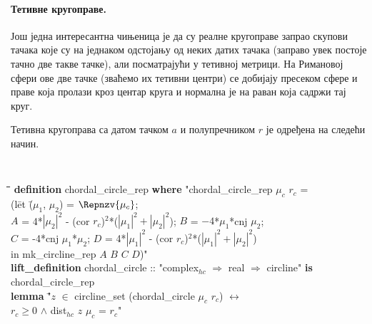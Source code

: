 \paragraph{Тетивне кругоправе.}
Још једна интересантна чињеница је да су реалне кругоправе запрао
скупови тачака које су на једнаком одстојању од неких датих тачака
(заправо увек постоје тачно две такве тачке), али посматрајући у
тетивној метрици. На Римановој сфери ове две тачке (зваћемо их тетивни
центри) се добијају пресеком сфере и праве која пролази кроз центар
круга и нормална је на раван која садржи тај круг.

Тетивна кругоправа са датом тачком $a$ и полупречником $r$ је одређена
на следећи начин.

{\tt
  \begin{tabbing}
    \hspace{5mm}\=\hspace{5mm}\=\hspace{5mm}\=\hspace{5mm}\=\hspace{5mm}\=\kill
{\bf definition} chordal\_circle\_rep {\bf where} "chordal\_circle\_rep $\mu_c$ $r_c$ = \\
\>  (l\=et \=($\mu_1$, $\mu_2$) = $\Repnzv{\mu_c}$;\\
\>\>\>$A$ = 4*$|\mu_2|^2$ - (cor $r_c$)$^2$*($|\mu_1|^2 + |\mu_2|^2$); $B$ = $-4$*$\mu_1$*cnj $\mu_2$;\\
\>\>\>$C$ = -4*cnj $\mu_1$*$\mu_2$; $D$ = 4*$|\mu_1|^2$ - (cor $r_c$)$^2$*($|\mu_1|^2 + |\mu_2|^2$)\\
\>\>in mk\_circline\_rep $A$ $B$ $C$ $D$)"\\
{\bf lift\_definition} chordal\_circle :: "complex$_{hc}$ $\Rightarrow$ real $\Rightarrow$ circline" {\bf is}\\
\> chordal\_circle\_rep\\
{\bf lemma} "\=$z$ $\in$ circline\_set (chordal\_circle $\mu_c$ $r_c$) $\longleftrightarrow$\\
\>$r_c \ge 0$ $\wedge$ dist$_{hc}$ $z$ $\mu_c$ = $r_c$"
  \end{tabbing}
}

